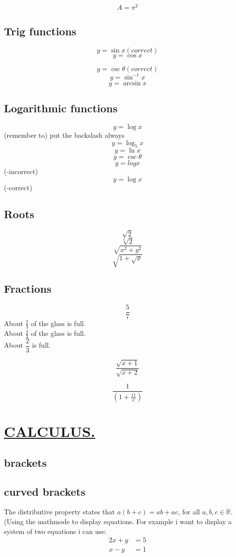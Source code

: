 \documentclass{article}
\begin{document}
	$$A=\pi ^2$$
	
	\subsection{Trig  functions}
	$$y=\sin x(correct)$$
	$$y=\cos x$$
	
	$$y=\csc \theta(correct)$$
	$$y=\sin^{-1} x$$
	$$y=\arcsin x$$
	\subsection{Logarithmic functions}
	$$y=\log x$$(remember to) put the backslash always
	$$y=\log_5 x$$
	$$y=\ln x$$
   $$y=\csc \theta$$
   $$y=logx$$ (-incorrect)
	$$y=\log x$$ (-correct)
	
	\subsection{Roots}
	
	$$\sqrt{2}$$
	$$\sqrt[3]{2}$$
	$$\sqrt{x^2+y^2}$$
	$$\sqrt{1+\sqrt{x}}$$
	
	\subsection{Fractions}
	
	$$\frac{5}{7}$$
	About $\displaystyle \frac{2}{3}$ of the glass is full.\\[16pt]
	About $\frac{2}{3}$ of the glass is full.\\[6pt]
   About $\dfrac{2}{3}$ is full.
   
   $$\frac{\sqrt{x+1}}{\sqrt{x+2}}$$
  
  $$\frac{1}{   (1+\frac{11}{x})    }$$
  
  \section{\underline{CALCULUS.}}
  \subsection{brackets}
  \subsection{curved brackets}
  The distributive property states that $a(b+c)=ab+ac$, for all $a, b, c \in \mathbb{R}$.\\
  (Using the mathmode to display equations. For example i want to display a system of two equations i can use:\\
  \begin{align}
  	2x + y &= 5\\
  	x -y &= 1
  	\end{align}\\
  	
\end{document}
